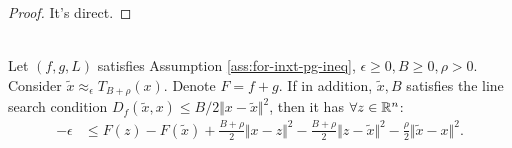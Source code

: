\documentclass[12pt]{article}
\begin{document}
        \begin{proof}
            It's direct. 
        \end{proof}
        \begin{theorem}\;\label{thm:inxt-pg-ineq}\\
            Let $(f, g, L)$ satisfies Assumption \ref{ass:for-inxt-pg-ineq}, $\epsilon \ge 0, B \ge 0, \rho > 0$. 
            Consider $\tilde x \approx_\epsilon T_{B + \rho}(x)$. 
            Denote $F = f + g$. 
            If in addition, $\tilde x, B$ satisfies the line search condition $D_f(\tilde x, x) \le B/2\Vert x - \tilde x\Vert^2$, then it has $\forall z \in \mathbb R^n$: 
            \begin{align*}
                - \epsilon &\le 
                F(z) - F(\tilde x)
                + \frac{B + \rho}{2}\Vert x - z\Vert^2
                - \frac{B + \rho}{2}\Vert z - \tilde x\Vert^2
                - \frac{\rho}{2}\Vert \tilde x - x\Vert^2. 
            \end{align*}
        \end{theorem}
\end{document}
